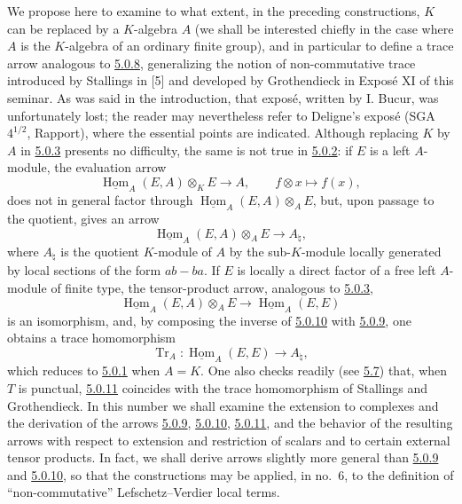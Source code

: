 \documentclass[11pt]{article}
\providecommand{\uHom}{\underline{\Hom}}
\DeclareMathOperator{\Hom}{Hom}
\providecommand{\Tr}{\operatorname{Tr}}
\providecommand{\Tr}{\operatorname{Tr}}
\providecommand{\Tr}{\operatorname{Tr}}
\providecommand{\Hom}{\operatorname{Hom}}
\providecommand{\Tr}{\operatorname{Tr}}
\providecommand{\Hom}{\operatorname{Hom}}
\providecommand{\Tr}{\operatorname{Tr}}
\begin{document}
We propose here to examine to what extent, in the preceding constructions, $K$ can be replaced by a $K$-algebra $A$ (we shall be interested chiefly in the case where $A$ is the $K$-algebra of an ordinary finite group), and in particular to define a trace arrow analogous to \hyperref[sga5:IIIB:equation:5.0.8]{5.0.8}, generalizing the notion of non-commutative trace introduced by Stallings in [5] and developed by Grothendieck in Expos\'e XI of this seminar. As was said in the introduction, that expos\'e, written by I. Bucur, was unfortunately lost; the reader may nevertheless refer to Deligne's expos\'e (SGA $4^{1/2}$, Rapport), where the essential points are indicated. Although replacing $K$ by $A$ in \hyperref[sga5:IIIB:equation:5.0.3]{5.0.3} presents no difficulty, the same is not true in \hyperref[sga5:IIIB:equation:5.0.2]{5.0.2}: if $E$ is a left $A$-module, the evaluation arrow
\[
\uHom_A(E,A)\otimes_KE\longrightarrow A,
\qquad f\otimes x\longmapsto f(x),
\]
does not in general factor through $\uHom_A(E,A)\otimes_AE$, but, upon passage to the quotient, gives an arrow
\begin{equation}\tag{5.0.9}\label{sga5:IIIB:equation:5.0.9}
\uHom_A(E,A)\otimes_AE\longrightarrow A_\natural,
\end{equation}
where $A_\natural$ is the quotient $K$-module of $A$ by the sub-$K$-module locally generated by local sections of the form $ab-ba$. If $E$ is locally a direct factor of a free left $A$-module of finite type, the tensor-product arrow, analogous to \hyperref[sga5:IIIB:equation:5.0.3]{5.0.3},
\begin{equation}\tag{5.0.10}\label{sga5:IIIB:equation:5.0.10}
\uHom_A(E,A)\otimes_AE\longrightarrow\uHom_A(E,E)
\end{equation}
is an isomorphism, and, by composing the inverse of \hyperref[sga5:IIIB:equation:5.0.10]{5.0.10} with \hyperref[sga5:IIIB:equation:5.0.9]{5.0.9}, one obtains a trace homomorphism
\begin{equation}\tag{5.0.11}\label{sga5:IIIB:equation:5.0.11}
\Tr_A:\uHom_A(E,E)\longrightarrow A_\natural,
\end{equation}
which reduces to \hyperref[sga5:IIIB:equation:5.0.1]{5.0.1} when $A=K$. One also checks readily (see \hyperref[sga5:IIIB:subsubsection:5.7]{5.7}) that, when $T$ is punctual, \hyperref[sga5:IIIB:equation:5.0.11]{5.0.11} coincides with the trace homomorphism of Stallings and Grothendieck. In this number we shall examine the extension to complexes and the derivation of the arrows \hyperref[sga5:IIIB:equation:5.0.9]{5.0.9}, \hyperref[sga5:IIIB:equation:5.0.10]{5.0.10}, \hyperref[sga5:IIIB:equation:5.0.11]{5.0.11}, and the behavior of the resulting arrows with respect to extension and restriction of scalars and to certain external tensor products. In fact, we shall derive arrows slightly more general than \hyperref[sga5:IIIB:equation:5.0.9]{5.0.9} and \hyperref[sga5:IIIB:equation:5.0.10]{5.0.10}, so that the constructions may be applied, in no.~6, to the definition of ``non-commutative'' Lefschetz--Verdier local terms.
\end{document}
